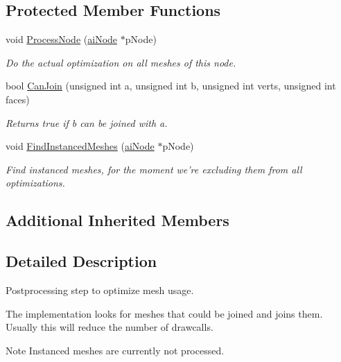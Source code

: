 \subsection*{Protected Member Functions}
\begin{DoxyCompactItemize}
\item 
void \hyperlink{class_assimp_1_1_optimize_meshes_process_a362186826ee6914f1ef31170f8231117}{Process\+Node} (\hyperlink{structai_node}{ai\+Node} $\ast$p\+Node)
\begin{DoxyCompactList}\small\item\em Do the actual optimization on all meshes of this node. \end{DoxyCompactList}\item 
bool \hyperlink{class_assimp_1_1_optimize_meshes_process_af549a85d595b5a0336df11008087cc1e}{Can\+Join} (unsigned int a, unsigned int b, unsigned int verts, unsigned int faces)
\begin{DoxyCompactList}\small\item\em Returns true if b can be joined with a. \end{DoxyCompactList}\item 
\hypertarget{class_assimp_1_1_optimize_meshes_process_ad952acdcb5f6898f758544bb33d1a61c}{void \hyperlink{class_assimp_1_1_optimize_meshes_process_ad952acdcb5f6898f758544bb33d1a61c}{Find\+Instanced\+Meshes} (\hyperlink{structai_node}{ai\+Node} $\ast$p\+Node)}\label{class_assimp_1_1_optimize_meshes_process_ad952acdcb5f6898f758544bb33d1a61c}

\begin{DoxyCompactList}\small\item\em Find instanced meshes, for the moment we're excluding them from all optimizations. \end{DoxyCompactList}\end{DoxyCompactItemize}
\subsection*{Additional Inherited Members}


\subsection{Detailed Description}
Postprocessing step to optimize mesh usage. 

The implementation looks for meshes that could be joined and joins them. Usually this will reduce the number of drawcalls.

\begin{DoxyNote}{Note}
Instanced meshes are currently not processed. 
\end{DoxyNote}


